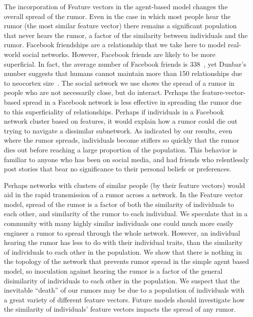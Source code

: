 The incorporation of Feature vectors in the agent-based model changes the overall spread of the rumor.
Even in the case in which most people hear the rumor (the most similar feature vector) there remains a significant population that never hears the rumor, a factor of the similarity between individuals and the rumor.
Facebook friendships are a relationship that we take here to model real-world social networks.
However, Facebook friends are likely to be more superficial.
In fact, the average number of Facebook friends is 338~\cite{smith-2014}, yet Dunbar's number suggests that humans cannot maintain more than 150 relationships due to neocortex size~\cite{dunbar-1992}.
The social network we use shows the spread of a rumor in people who are not necessarily close, but do interact.
Perhaps the feature-vector-based spread in a Facebook network is less effective in spreading the rumor due to this superficiality of relationships.
Perhaps if individuals in a Facebook network cluster based on features, it would explain how a rumor could die out trying to navigate a dissimilar subnetwork.
As indicated by our results, even where the rumor spreads, individuals become stiflers so quickly that the rumor dies out before reaching a large proportion of the population.
This behavior is familiar to anyone who has been on social media, and had friends who relentlessly post stories that bear no significance to their personal beliefs or preferences.


Perhaps networks with clusters of similar people (by their feature vectors) would aid in the rapid transmission of a rumor across a network.
In the Feature vector model, spread of the rumor is a factor of both the similarity of individuals to each other, and similarity of the rumor to each individual.
We speculate that in a community with many highly similar individuals one could much more easily engineer a rumor to spread through the whole network.
However, an individual hearing the rumor has less to do with their individual traits, than the similarity of individuals to each other in the population.
We show that there is nothing in the topology of the network that prevents rumor spread in the simple agent based model, so inoculation against hearing the rumor is a factor of the general disimilarity of individuals to each other in the population.
We suspect that the inevitable ``death'' of our rumors may be due to a population of individuals with a great variety of different feature vectors.
Future models should investigate how the similarity of individuals' feature vectors impacts the spread of any rumor.


